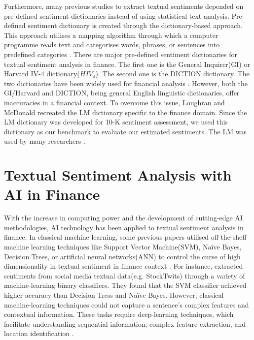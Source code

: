\documentclass[logo,bsc,singlespacing,parskip]{infthesis}
\begin{document}
Furthermore, many previous studies to extract textual sentiments depended on pre-defined sentiment dictionaries instead of using statistical text analysis. Pre-defined sentiment dictionary is created through the dictionary-based approach. This approach utilises a mapping algorithm through which a computer programme reads text and categorises words, phrases, or sentences into predefined categories \cite{Li2010}. There are major pre-defined sentiment dictionaries for textual sentiment analysis in finance. The first one is the General Inquirer(GI) or Harvard IV-4 dictionary($HIV_4$). The second one is the DICTION dictionary. The two dictionaries have been widely used for financial analysis \cite{Tetlock2007, Engelberg2008, Engelberg2012, Ferris2013, Henry2009, Davis2014}. However, both the GI/Harvard and DICTION, being general English linguistic dictionaries, offer inaccuracies in a financial context. To overcome this issue, Loughran and McDonald recreated the LM dictionary specific to the finance domain. Since the LM dictionary was developed for 10-K sentiment assessment, we used this dictionary as our benchmark to evaluate our estimated sentiments. The LM was used by many researchers \cite{Doran2010, Huang2013, Ferguson2015, Chen2013, Loughran2013}.

\section{Textual Sentiment Analysis with AI in Finance}

With the increase in computing power and the development of cutting-edge AI methodologies, AI technology has been applied to textual sentiment analysis in finance. In classical machine learning, some previous papers utilised off-the-shelf machine learning techniques like Support Vector Machine(SVM), Naïve Bayes, Decision Trees, or artificial neural networks(ANN) to control the curse of high dimensionality in textual sentiment in finance context \cite{Huang2014, Li2010, Li2009, Shuhidan2018, inproceedings}. For instance, \cite{inproceedings} extracted sentiments from social media textual data(e.g. StockTwits) through a variety of machine-learning binary classifiers. They found that the SVM classifier achieved higher accuracy than Decision Tress and Naïve Bayes. However, classical machine-learning techniques could not capture a sentence's complex features and contextual information. These tasks require deep-learning techniques, which facilitate understanding sequential information, complex feature extraction, and location identification \cite{Sohangir2018}.
\end{document}

